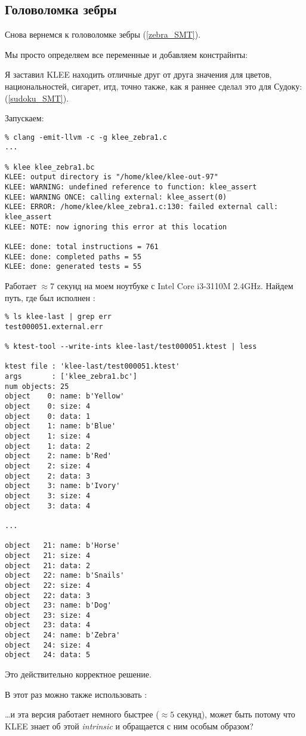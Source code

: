 \subsection{Головоломка зебры}

Снова вернемся к головоломке зебры (\ref{zebra_SMT}).

Мы просто определяем все переменные и добавляем констрайнты:



Я заставил KLEE находить отличные друг от друга значения для цветов, национальностей, сигарет, итд, точно также,
как я раннее сделал это для Судоку: (\ref{sudoku_SMT}).

Запускаем:

\begin{lstlisting}
% clang -emit-llvm -c -g klee_zebra1.c
...

% klee klee_zebra1.bc
KLEE: output directory is "/home/klee/klee-out-97"
KLEE: WARNING: undefined reference to function: klee_assert
KLEE: WARNING ONCE: calling external: klee_assert(0)
KLEE: ERROR: /home/klee/klee_zebra1.c:130: failed external call: klee_assert
KLEE: NOTE: now ignoring this error at this location

KLEE: done: total instructions = 761
KLEE: done: completed paths = 55
KLEE: done: generated tests = 55
\end{lstlisting}

Работает $\approx 7$ секунд на моем ноутбуке с Intel Core i3-3110M 2.4GHz.
Найдем путь, где был исполнен :

\begin{lstlisting}
% ls klee-last | grep err
test000051.external.err

% ktest-tool --write-ints klee-last/test000051.ktest | less

ktest file : 'klee-last/test000051.ktest'
args       : ['klee_zebra1.bc']
num objects: 25
object    0: name: b'Yellow'
object    0: size: 4
object    0: data: 1
object    1: name: b'Blue'
object    1: size: 4
object    1: data: 2
object    2: name: b'Red'
object    2: size: 4
object    2: data: 3
object    3: name: b'Ivory'
object    3: size: 4
object    3: data: 4

...

object   21: name: b'Horse'
object   21: size: 4
object   21: data: 2
object   22: name: b'Snails'
object   22: size: 4
object   22: data: 3
object   23: name: b'Dog'
object   23: size: 4
object   23: data: 4
object   24: name: b'Zebra'
object   24: size: 4
object   24: data: 5
\end{lstlisting}

Это действительно корректное решение.

В этот раз можно также использовать :



\dots и эта версия работает немного быстрее ($\approx 5$ секунд),
может быть потому что KLEE знает об этой \textit{intrinsic} и обращается с ним особым образом?

